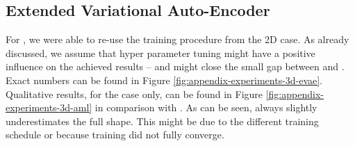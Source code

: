\subsection{Extended Variational Auto-Encoder}
\label{sec:appendix-experiments-3d-evae}

For \EVAE, we were able to re-use the training procedure from the 2D case.
As already discussed, we assume that hyper parameter tuning might have a 
positive influence on the achieved results -- and might close the small
gap between \EVAE and \AML. Exact numbers can be found in Figure 
\ref{fig:appendix-experiments-3d-evae}. Qualitative results, for the
\hard case only, can be found in Figure \ref{fig:appendix-experiments-3d-aml}
in comparison with \AML. As can be seen, \EVAE always
slightly underestimates the full shape. This might be due to the different training
schedule or because training did not fully converge.

